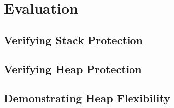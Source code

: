 
\chapter{Evaluation}

\section{Verifying Stack Protection}

\section{Verifying Heap Protection}

\section{Demonstrating Heap Flexibility}

